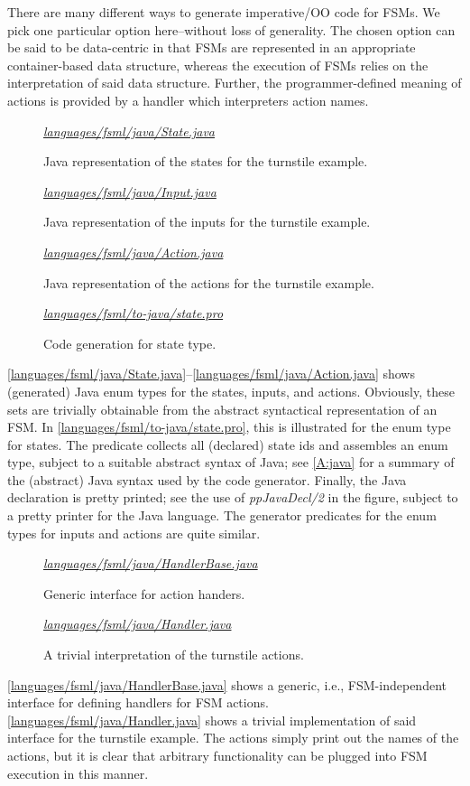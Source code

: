 \documentclass[preprint,authoryear,12pt]{noelsarticle}
\newcommand{\codefigure}[3]{
\begin{figure}[t!]
\begin{boxedminipage}{\hsize}
\mbox{}\hfill{}{\small\textit{\href{http://github.com/slebok/slepro/tree/master/#2}{#2}}}

\end{boxedminipage}
\caption{#1.}
\label{#2}
\medskip
\end{figure}}
\begin{document}
There are many different ways to generate imperative/OO code for
FSMs. We pick one particular option here--without loss of
generality. The chosen option can be said to be data-centric in that
FSMs are represented in an appropriate container-based data structure,
whereas the execution of FSMs relies on the interpretation of said
data structure. Further, the programmer-defined meaning of actions is
provided by a handler which interpreters action names.

\codefigure{%
Java representation of the states for the turnstile example}{%
languages/fsml/java/State.java}{%
java}

\codefigure{%
Java representation of the inputs for the turnstile example}{%
languages/fsml/java/Input.java}{%
java}

\codefigure{%
Java representation of the actions for the turnstile example}{%
languages/fsml/java/Action.java}{%
java}

\codefigure{%
Code generation for state type}{%
languages/fsml/to-java/state.pro}{%
prolog}

\autoref{languages/fsml/java/State.java}--\autoref{languages/fsml/java/Action.java}
shows (generated) Java enum types for the states, inputs, and
actions. Obviously, these sets are trivially obtainable from the
abstract syntactical representation of an FSM. In
\autoref{languages/fsml/to-java/state.pro}, this is illustrated for
the enum type for states. The predicate collects all (declared) state
ids and assembles an enum type, subject to a suitable abstract syntax
of Java; see \ref{A:java} for a summary of the (abstract) Java
syntax used by the code generator. Finally, the Java declaration is
pretty printed; see the use of \emph{ppJavaDecl/2} in the figure,
subject to a pretty printer for the Java language. The generator
predicates for the enum types for inputs and actions are quite
similar.

\codefigure{%
Generic interface for action handers}{%
languages/fsml/java/HandlerBase.java}{%
java}

\codefigure{%
A trivial interpretation of the turnstile actions}{%
languages/fsml/java/Handler.java}{%
java}

\autoref{languages/fsml/java/HandlerBase.java} shows a generic, i.e.,
FSM-independent interface for defining handlers for FSM
actions. \autoref{languages/fsml/java/Handler.java} shows a
trivial implementation of said interface for the turnstile
example. The actions simply print out the names of the actions, but it
is clear that arbitrary functionality can be plugged into FSM
execution in this manner. 
\end{document}
